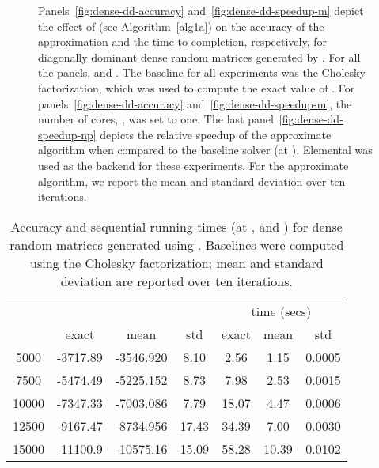 \begin{figure*}[t]
\begin{center}
\subfigure[Accuracy vs. ]{\texttt{[image: results/dense-dd-accuracy-m-p=0.png]}
\label{fig:dense-dd-accuracy}
}
\subfigure[Speedup vs. ]{\texttt{[image: results/dense-dd-speedup-m-p=0.png]}
\label{fig:dense-dd-speedup-m}
}
\end{center}
\caption{
Panels~\ref{fig:dense-dd-accuracy} and~\ref{fig:dense-dd-speedup-m} depict the
effect of  (see Algorithm~\ref{alg1a}) on the accuracy of the approximation
and the time to completion, respectively, for diagonally dominant dense random
matrices generated by .
For all the panels,  and .
The baseline for all experiments was the Cholesky factorization, which was used
to compute the exact value of .
For panels~\ref{fig:dense-dd-accuracy} and~\ref{fig:dense-dd-speedup-m}, the
number of cores, , was set to one.
The last panel~\ref{fig:dense-dd-speedup-np} depicts the relative speedup of
the approximate algorithm when compared to the baseline solver (at ).
Elemental was used as the backend for these experiments.
For the approximate algorithm, we report the mean and standard deviation
over ten iterations.
}
\label{fig:dense-dd}
\end{figure*}
\begin{table}
\center
\scriptsize
\begin{tabular}{|c|c|c|c|c|c|c|}
\hline
\multirow{2}{*}{}  &
\multicolumn{3}{|c|}{} &
\multicolumn{3}{|c|}{time (secs)} \\
\cline{2-7}
      &   exact    & mean       & std   &   exact  & mean  &  std   \\\hline
5000  & -3717.89  & -3546.920  &  8.10  &   2.56   &  1.15 & 0.0005 \\\hline
7500  & -5474.49  & -5225.152  &  8.73  &   7.98   &  2.53 & 0.0015 \\\hline
10000 & -7347.33  & -7003.086  &  7.79  &  18.07   &  4.47 & 0.0006 \\\hline
12500 & -9167.47  & -8734.956  & 17.43  &  34.39   &  7.00 & 0.0030 \\\hline
15000 & -11100.9  & -10575.16  & 15.09  &  58.28   & 10.39 & 0.0102 \\\hline
\end{tabular}
\caption{
Accuracy and sequential running times (at ,  and ) for dense
random matrices generated using .
Baselines were computed using the Cholesky factorization; mean and standard
deviation are reported over ten iterations.
}
\label{tbl:dense-abs}
\normalsize
\end{table}

